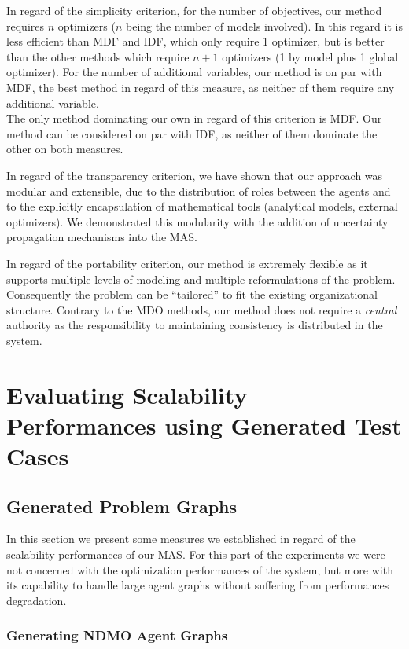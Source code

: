 In regard of the simplicity criterion, for the number of objectives, our method requires $n$ optimizers ($n$ being the number of models involved). In this regard it is less efficient than MDF and IDF, which only require 1 optimizer, but is better than the other methods which require $n+1$ optimizers (1 by model plus 1 global optimizer). For the number of additional variables, our method is on par with MDF, the best method in regard of this measure, as neither of them require any additional variable.\\
The only method dominating our own in regard of this criterion is MDF. Our method can be considered on par with IDF, as neither of them dominate the other on both measures.

In regard of the transparency criterion, we have shown that our approach was modular and extensible, due to the distribution of roles between the agents and to the explicitly encapsulation of mathematical tools (analytical models, external optimizers). We demonstrated this modularity with the addition of uncertainty propagation mechanisms into the MAS.

In regard of the portability criterion, our method is extremely flexible as it supports multiple levels of modeling and multiple reformulations of the problem. Consequently the problem can be \enquote{tailored} to fit the existing organizational structure. Contrary to the MDO methods, our method does not require a \emph{central} authority as the responsibility to maintaining consistency is distributed in the system.

\chapter{Evaluating Scalability Performances using Generated Test Cases}

\section{Generated Problem Graphs}

In this section we present some measures we established in regard of the scalability performances of our MAS. For this part of the experiments we were not concerned with the optimization performances of the system, but more with its capability to handle large agent graphs without suffering from performances degradation.

\subsection{Generating NDMO Agent Graphs}

